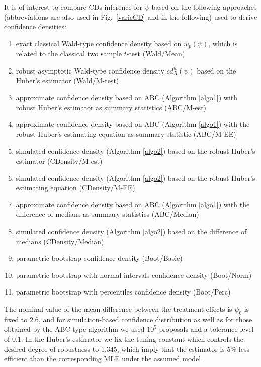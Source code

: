 \documentclass[preprint,12pt,authoryear]{elsarticle}
\begin{document}
It is of interest to compare CDs inference for $\psi$ based on the following approaches (abbreviations are also used in Fig.\ \ref{varieCD} and in the following) used to derive confidence densities:
\begin{enumerate}
\item 
exact classical Wald-type confidence density based on $w_p(\psi)$, which is related to the classical two sample $t$-test (Wald/Mean) 
\item 
robust asymptotic Wald-type confidence density $cd_R^w(\psi)$ based on the Huber's estimator (Wald/M-test)
\item 
approximate confidence density based on ABC (Algorithm \ref{algo1}) with robust Huber's estimator as summary statistics (ABC/M-est)
\item 
approximate confidence density based on ABC (Algorithm \ref{algo1}) with the robust Huber's estimating equation as summary statistic (ABC/M-EE)
\item 
simulated confidence density (Algorithm \ref{algo2}) based on the robust Huber's estimator (CDensity/M-est)
\item 
simulated confidence density (Algorithm \ref{algo2}) based on  the robust Huber's estimating equation  (CDensity/M-EE)
\item 
approximate confidence density based on ABC (Algorithm \ref{algo1}) with the difference of medians  as summary statistics (ABC/Median)
\item 
simulated  confidence density (Algorithm \ref{algo2}) based on the difference of medians  (CDensity/Median)
\item
parametric bootstrap  confidence density (Boot/Basic)
\item
parametric bootstrap with normal intervals confidence density (Boot/Norm)
\item
parametric bootstrap with percentiles confidence  density (Boot/Perc)
\end{enumerate}
The nominal value of the mean difference between the treatment effects is $\psi_0$ is fixed to 2.6, and for simulation-based confidence distribution as well as for those obtained by the ABC-type algorithm we used $10^5$ proposals and a tolerance level of $0.1$. In the Huber's estimator we fix the tuning constant which controls the desired degree of robustness to 1.345, which imply that the estimator is 5\% less efficient than the corresponding MLE under the assumed model.
\end{document}
